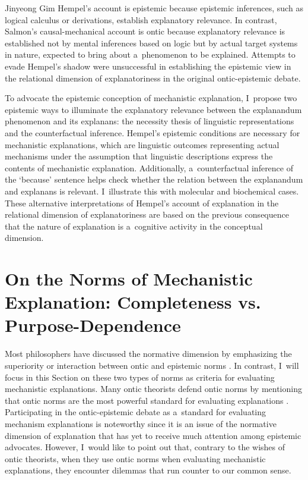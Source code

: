 \begin{artengenv}{Jinyeong Gim}
Hempel's account is epistemic because epistemic inferences, such as logical calculus or derivations, establish explanatory relevance. In contrast, Salmon's causal-mechanical account is ontic because explanatory relevance is established not by mental inferences based on logic but by actual target systems in nature, expected to bring about a~phenomenon to be explained. Attempts to evade Hempel's shadow were unsuccessful in establishing the epistemic view in the relational dimension of explanatoriness in the original ontic-epistemic debate.

To advocate the epistemic conception of mechanistic explanation, I~propose two epistemic ways to illuminate the explanatory relevance between the explanandum phenomenon and its explanans: the necessity thesis of linguistic representations and the counterfactual inference. Hempel's epistemic conditions are necessary for mechanistic explanations, which are linguistic outcomes representing actual mechanisms under the assumption that linguistic descriptions express the contents of mechanistic explanation. Additionally, a~counterfactual inference of the ‘because' sentence helps check whether the relation between the explanandum and explanans is relevant. I~illustrate this with molecular and biochemical cases. These alternative interpretations of Hempel's account of explanation in the relational dimension of explanatoriness are based on the previous consequence that the nature of explanation is a~cognitive activity in the conceptual dimension.

\section{On the Norms of Mechanistic Explanation: Completeness vs. Purpose-Dependence}
Most philosophers have discussed the normative dimension by emphasizing the superiority or interaction between ontic and epistemic norms
\parencites[][]{kaplan_explanatory_2011}[][]{illari_mechanistic_2013}[][]{van_eck_reconciling_2015}[][]{sheredos_re-reconciling_2016}. %
 In contrast, I~will focus in this Section on these two types of norms as criteria for evaluating mechanistic explanations. Many ontic theorists defend ontic norms by mentioning that ontic norms are the most powerful standard for evaluating explanations 
\parencites[see][]{kaiser_ontic_2014}[][]{povich_minimal_2018}. %
 Participating in the ontic-epistemic debate as a~standard for evaluating mechanism explanations is noteworthy since it is an issue of the normative dimension of explanation that has yet to receive much attention among epistemic advocates. However, I~would like to point out that, contrary to the wishes of ontic theorists, when they use ontic norms when evaluating mechanistic explanations, they encounter dilemmas that run counter to our common sense.


\end{artengenv}
